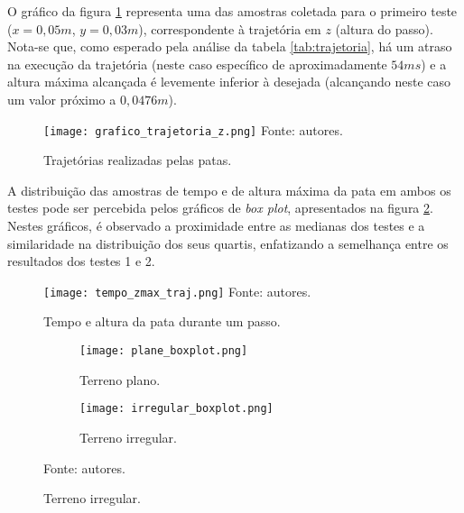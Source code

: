 \documentclass[../main.tex]{subfiles}
\begin{document}
  O gráfico da figura \ref{fig:grafico_trajetoria_xyz} representa uma das amostras coletada para o primeiro teste ($x=0,05m$, $y=0,03m$), correspondente à trajetória em $z$ (altura do passo). Nota-se que, como esperado pela análise da tabela \ref{tab:trajetoria}, há um atraso na execução da trajetória (neste caso específico de aproximadamente $54ms$) e a altura máxima alcançada é levemente inferior à desejada (alcançando neste caso um valor próximo a $0,0476m$).
  
  \vspace{-0.4\baselineskip}
  
  \begin{figure}[!htb]
    \centering
    \caption{Trajetórias realizadas pelas patas.}
    \texttt{[image: grafico\_trajetoria\_z.png]}
    Fonte: autores.
    \label{fig:grafico_trajetoria_xyz}
  \end{figure}
  \vspace{-0.4\baselineskip}

  A distribuição das amostras de tempo e de altura máxima da pata em ambos os testes pode ser percebida pelos gráficos de \textit{box plot}, apresentados na figura \ref{fig:time_zmax_traj}. Nestes gráficos, é observado a proximidade entre as medianas dos testes e a similaridade na distribuição dos seus quartis, enfatizando a semelhança entre os resultados dos testes 1 e 2.

  \begin{figure}[!htb]
    \centering
    \caption{Tempo e altura da pata durante um passo.}
    \texttt{[image: tempo\_zmax\_traj.png]}
    Fonte: autores.
    \label{fig:time_zmax_traj}
  \end{figure}

  \begin{figure}[!htb]
    \centering
    \caption{Oscilação do corpo em ambos os tipos de terreno.}
    \begin{subfigure}[t]{0.49\textwidth}
      \centering
      \texttt{[image: plane\_boxplot.png]}
      \caption{Terreno plano.}
      \label{fig:imu_test_plane}
    \end{subfigure}
    \begin{subfigure}[t]{0.49\textwidth}
      \centering
      \texttt{[image: irregular\_boxplot.png]}
      \caption{Terreno irregular.}
      \label{fig:imu_test_irregular}
    \end{subfigure}
    
    Fonte: autores.
    \label{fig:imu_test}
  \end{figure}
\end{document}
